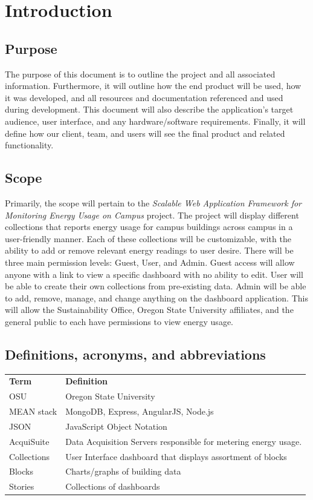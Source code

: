 \documentclass[onecolumn, draftclsnofoot,10pt, compsoc]{IEEEtran}
\begin{document}
    \section{Introduction}
    \subsection{Purpose}
	The purpose of this document is to outline the project and all associated information. Furthermore, it will outline how the end product will be used, how it was developed, and all resources and documentation referenced and used during development. This document will also describe the application’s target audience, user interface, and any hardware/software requirements. Finally, it will define how our client, team, and users will see the final product and related functionality.
    \subsection{Scope}
	Primarily, the scope will pertain to the \textit{Scalable Web Application Framework for Monitoring Energy Usage on Campus}  project. The project will display different collections that reports energy usage for campus buildings across campus in a user-friendly manner. Each of these collections will be customizable, with the ability to add or remove relevant energy readings to user desire. There will be three main permission levels: Guest, User, and Admin. Guest access will allow anyone with a link to view a specific dashboard with no ability to edit. User will be able to create their own collections from pre-existing data. Admin will be able to add, remove, manage, and change anything on the dashboard application. This will allow the Sustainability Office, Oregon State University affiliates, and the general public to each have permissions to view energy usage.
    \subsection{Definitions, acronyms, and abbreviations} \label{definition}
	\begin{table}[h]
	\centering
	
	\begin{tabular}{ll}
	\textbf{Term} & \textbf{Definition} \\
	OSU & Oregon State University \\
	MEAN stack & MongoDB, Express, AngularJS, Node.js \\
	JSON & JavaScript Object Notation \\
	AcquiSuite & Data Acquisition Servers responsible for metering energy usage. \\
	Collections & User Interface dashboard that displays assortment of blocks \\
    Blocks & Charts/graphs of building data \\
    Stories & Collections of dashboards 
	\end{tabular}
	\end{table}
\end{document}
